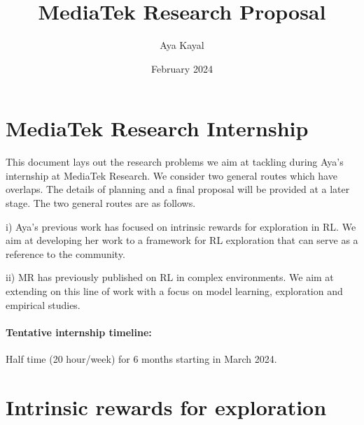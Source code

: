 \documentclass{article}
\title{MediaTek Research Proposal}
\author{Aya Kayal}
\date{February 2024}
\begin{document}
\maketitle

\section*{MediaTek Research Internship}

This document lays out the research problems we aim at tackling during Aya's internship at MediaTek Research. We consider two general routes which have overlaps. The details of planning and a final proposal will be provided at a later stage. The two general routes are as follows. 

i) Aya's previous work has focused on intrinsic rewards for exploration in RL. We aim at developing her work to a framework for RL exploration that can serve as a reference to the community. 

ii) MR has previously published on RL in complex environments. We aim at extending on this line of work with a focus on model learning,  exploration and empirical studies. 

\paragraph{Tentative internship timeline:} Half time (20 hour/week) for 6 months starting in March 2024. 


\section{Intrinsic rewards for exploration}
\end{document}
